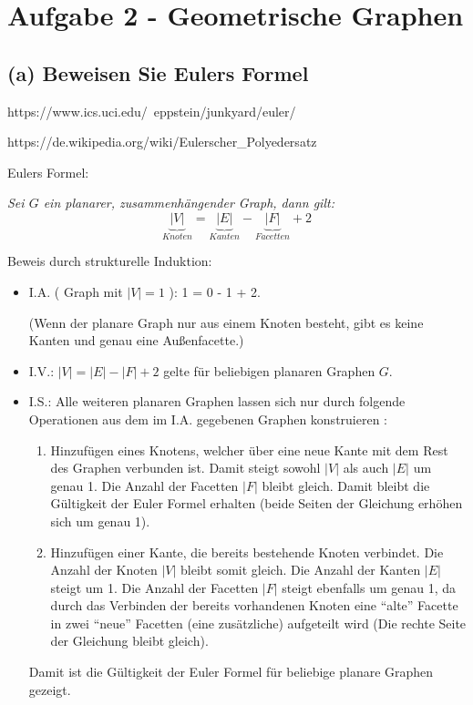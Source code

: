 \documentclass[a4paper]{article}
\begin{document}
\section*{Aufgabe 2 - Geometrische Graphen}

\subsection*{(a) Beweisen Sie Eulers Formel}

https://www.ics.uci.edu/~eppstein/junkyard/euler/

https://de.wikipedia.org/wiki/Eulerscher\_Polyedersatz

Eulers Formel:

\textit{Sei $G$ ein planarer, zusammenhängender Graph, dann gilt:}
 $$\underbrace{|V|}_{Knoten} = \underbrace{|E|}_{Kanten} - \underbrace{|F|}_{Facetten} + 2 $$

Beweis durch strukturelle Induktion:

\begin{itemize}
  \item I.A. ( Graph mit $|V| = 1$ ): 1 = 0 - 1 + 2. \checkmark
  
	(Wenn der planare Graph nur aus einem Knoten besteht, gibt es keine Kanten und genau
	eine Außenfacette.)
  
  \item I.V.: $|V| = |E| - |F| + 2 $ gelte für beliebigen planaren Graphen $G$.
  \item I.S.: Alle weiteren planaren Graphen lassen sich nur durch folgende Operationen aus dem im I.A. gegebenen Graphen konstruieren :
  	\begin{enumerate}
  		\item Hinzufügen eines Knotens, welcher über eine neue Kante mit dem Rest des Graphen verbunden ist. Damit steigt sowohl $|V|$ als auch $|E|$ um genau 1. Die Anzahl
  		der Facetten $|F|$ bleibt gleich. Damit bleibt die Gültigkeit der Euler Formel erhalten (beide Seiten der Gleichung erhöhen sich um genau 1). 
  		\item Hinzufügen einer Kante, die bereits bestehende Knoten verbindet. Die Anzahl
  		der Knoten $|V|$ bleibt somit gleich. Die Anzahl der Kanten $|E|$ steigt um 1. 
  		Die Anzahl der Facetten $|F|$ steigt ebenfalls um genau 1, da durch das Verbinden
  		der bereits vorhandenen Knoten eine "`alte"' Facette in zwei "`neue"' Facetten
  		(eine zusätzliche) aufgeteilt wird (Die rechte Seite der Gleichung bleibt gleich).
  		
	\end{enumerate}  
	Damit ist die Gültigkeit der Euler Formel für beliebige planare Graphen gezeigt. \checkmark		  
\end{itemize}
\end{document}
